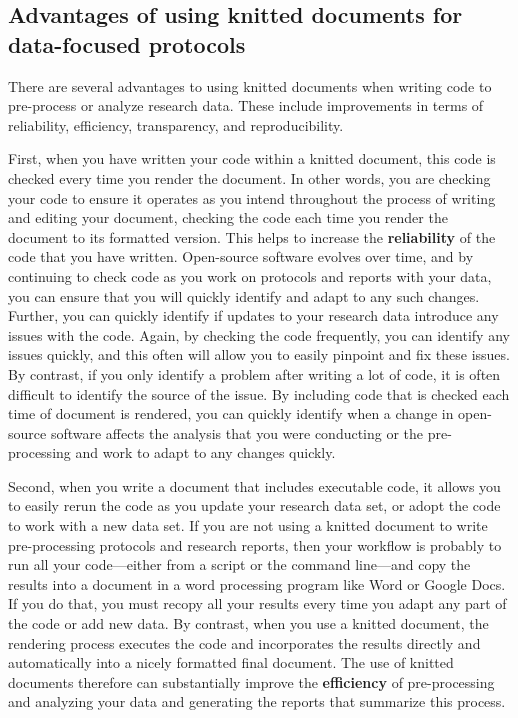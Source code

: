 \documentclass[]{tufte-book}
\begin{document}
\subsection{Advantages of using knitted documents for data-focused protocols}\label{advantages-of-using-knitted-documents-for-data-focused-protocols}

There are several advantages to using knitted documents when writing code to
pre-process or analyze research data. These include improvements in terms of
reliability, efficiency, transparency, and reproducibility.

First, when you have written your code within a knitted document, this code is
checked every time you render the document. In other words, you are checking
your code to ensure it operates as you intend throughout the process of writing
and editing your document, checking the code each time you render the document
to its formatted version. This helps to increase the \textbf{reliability} of the code
that you have written. Open-source software evolves over time, and by continuing
to check code as you work on protocols and reports with your data, you can
ensure that you will quickly identify and adapt to any such changes. Further,
you can quickly identify if updates to your research data introduce any issues
with the code. Again, by checking the code frequently, you can identify any
issues quickly, and this often will allow you to easily pinpoint and fix these
issues. By contrast, if you only identify a problem after writing a lot of code,
it is often difficult to identify the source of the issue. By including code
that is checked each time of document is rendered, you can quickly identify when
a change in open-source software affects the analysis that you were conducting
or the pre-processing and work to adapt to any changes quickly.

Second, when you write a document that includes executable code, it allows you
to easily rerun the code as you update your research data set, or adopt the code
to work with a new data set. If you are not using a knitted document to write
pre-processing protocols and research reports, then your workflow is probably to
run all your code---either from a script or the command line---and copy the
results into a document in a word processing program like Word or Google Docs.
If you do that, you must recopy all your results every time you adapt any part
of the code or add new data. By contrast, when you use a knitted document, the
rendering process executes the code and incorporates the results directly and
automatically into a nicely formatted final document. The use of knitted
documents therefore can substantially improve the \textbf{efficiency} of
pre-processing and analyzing your data and generating the reports that summarize
this process.
\end{document}
